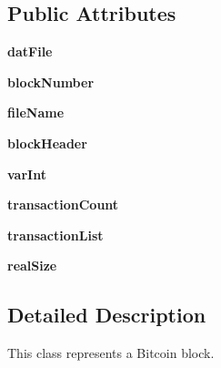 \subsection*{Public Attributes}
\begin{DoxyCompactItemize}
\item 
\hypertarget{classbitcoin_1_1Block_1_1Block_a306c1e5cdb79e5e65e6d25fbed4fc0d6}{}{\bfseries dat\+File}\label{classbitcoin_1_1Block_1_1Block_a306c1e5cdb79e5e65e6d25fbed4fc0d6}

\item 
\hypertarget{classbitcoin_1_1Block_1_1Block_a7814298b3c89583c5868f5dc607787dc}{}{\bfseries block\+Number}\label{classbitcoin_1_1Block_1_1Block_a7814298b3c89583c5868f5dc607787dc}

\item 
\hypertarget{classbitcoin_1_1Block_1_1Block_ae06d70079f0cb1314cc6c45fc7934912}{}{\bfseries file\+Name}\label{classbitcoin_1_1Block_1_1Block_ae06d70079f0cb1314cc6c45fc7934912}

\item 
\hypertarget{classbitcoin_1_1Block_1_1Block_a63b6295f70b1970920f99d6cfc2fd41e}{}{\bfseries block\+Header}\label{classbitcoin_1_1Block_1_1Block_a63b6295f70b1970920f99d6cfc2fd41e}

\item 
\hypertarget{classbitcoin_1_1Block_1_1Block_a0529b5490bfc5cb6e44522483def9a46}{}{\bfseries var\+Int}\label{classbitcoin_1_1Block_1_1Block_a0529b5490bfc5cb6e44522483def9a46}

\item 
\hypertarget{classbitcoin_1_1Block_1_1Block_a6a62e50a0ac07f200eadd59349150be9}{}{\bfseries transaction\+Count}\label{classbitcoin_1_1Block_1_1Block_a6a62e50a0ac07f200eadd59349150be9}

\item 
\hypertarget{classbitcoin_1_1Block_1_1Block_a4c491065c600173fbf7f7b67603b0298}{}{\bfseries transaction\+List}\label{classbitcoin_1_1Block_1_1Block_a4c491065c600173fbf7f7b67603b0298}

\item 
\hypertarget{classbitcoin_1_1Block_1_1Block_a84c1888518b13911de66e65982b81337}{}{\bfseries real\+Size}\label{classbitcoin_1_1Block_1_1Block_a84c1888518b13911de66e65982b81337}

\end{DoxyCompactItemize}


\subsection{Detailed Description}
\begin{DoxyVerb}This class represents a Bitcoin block.\end{DoxyVerb}
 

